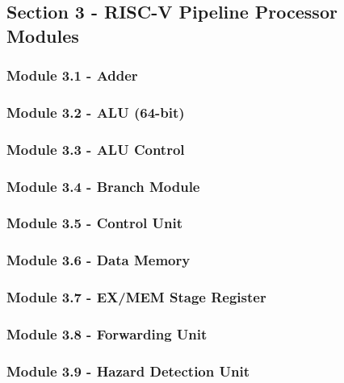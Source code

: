 \documentclass[12pt]{article}
\begin{document}
\subsection*{\Large Section 3 - RISC-V Pipeline Processor Modules}
\subsubsection*{\large Module 3.1 - Adder}

\subsubsection*{\large Module 3.2 - ALU (64-bit)}

\subsubsection*{\large Module 3.3 - ALU Control}

\subsubsection*{\large Module 3.4 - Branch Module}

\subsubsection*{\large Module 3.5 - Control Unit}

\subsubsection*{\large Module 3.6 - Data Memory}

\subsubsection*{\large Module 3.7 - EX/MEM Stage Register}

\subsubsection*{\large Module 3.8 - Forwarding Unit}

\subsubsection*{\large Module 3.9 - Hazard Detection Unit}

\end{document}
